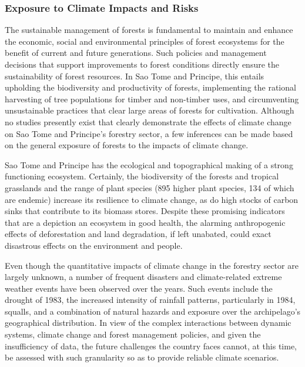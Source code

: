\documentclass[
]{book}
\begin{document}
\hypertarget{exposure-to-climate-impacts-and-risks-5}{%
\subsubsection{Exposure to Climate Impacts and Risks}\label{exposure-to-climate-impacts-and-risks-5}}

The sustainable management of forests is fundamental to maintain and enhance the economic, social and environmental principles of forest ecosystems for the benefit of current and future generations. Such policies and management decisions that support improvements to forest conditions directly ensure the sustainability of forest resources. In Sao Tome and Principe, this entails upholding the biodiversity and productivity of forests, implementing the rational harvesting of tree populations for timber and non-timber uses, and circumventing unsustainable practices that clear large areas of forests for cultivation. Although no studies presently exist that clearly demonstrate the effects of climate change on Sao Tome and Principe's forestry sector, a few inferences can be made based on the general exposure of forests to the impacts of climate change.

Sao Tome and Principe has the ecological and topographical making of a strong functioning ecosystem. Certainly, the biodiversity of the forests and tropical grasslands and the range of plant species (895 higher plant species, 134 of which are endemic) increase its resilience to climate change, as do high stocks of carbon sinks that contribute to its biomass stores. Despite these promising indicators that are a depiction an ecosystem in good health, the alarming anthropogenic effects of deforestation and land degradation, if left unabated, could exact disastrous effects on the environment and people.

Even though the quantitative impacts of climate change in the forestry sector are largely unknown, a number of frequent disasters and climate-related extreme weather events have been observed over the years. Such events include the drought of 1983, the increased intensity of rainfall patterns, particularly in 1984, squalls, and a combination of natural hazards and exposure over the archipelago's geographical distribution. In view of the complex interactions between dynamic systems, climate change and forest management policies, and given the insufficiency of data, the future challenges the country faces cannot, at this time, be assessed with such granularity so as to provide reliable climate scenarios.
\end{document}
